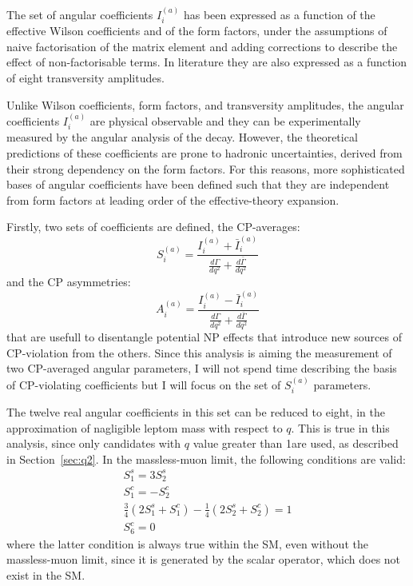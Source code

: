 The set of angular coefficients $I_i^{(a)}$ has been expressed as a function of the effective Wilson coefficients and of the form factors, under the assumptions of naive factorisation of the matrix element and adding corrections to describe the effect of non-factorisable terms.
In literature they are also expressed as a function of eight \Ks transversity amplitudes.

Unlike Wilson coefficients, form factors, and transversity amplitudes, the angular coefficients $I_i^{(a)}$ are physical observable and they can be experimentally measured by the angular analysis of the \BtoKstmumudecay decay.
However, the theoretical predictions of these coefficients are prone to hadronic uncertainties, derived from their strong dependency on the form factors.
For this reasons, more sophisticated bases of angular coefficients have been defined such that they are independent from form factors at leading order of the effective-theory expansion.

Firstly, two sets of coefficients are defined, the CP-averages:
\begin{equation}
  S^{(a)}_i = \frac{ I^{(a)}_i + \bar I^{(a)}_i }{\frac{d\Gamma}{dq^2} + \frac{d\bar\Gamma}{dq^2}}
  \label{eq:Ss}
\end{equation}
and the CP asymmetries:
\begin{equation}
  A^{(a)}_i = \frac{ I^{(a)}_i - \bar I^{(a)}_i }{\frac{d\Gamma}{dq^2}+\frac{d\bar\Gamma}{dq^2}}
  \label{eq:As}
\end{equation}
that are usefull to disentangle potential NP effects that introduce new sources of CP-violation from the others.
Since this analysis is aiming the measurement of two CP-averaged angular parameters, I will not spend time describing the basis of CP-violating coefficients but I will focus on the set of $S^{(a)}_i$ parameters.

The twelve real angular coefficients in this set can be reduced to eight, in the approximation of nagligible leptom mass with respect to $q$.
This is true in this analysis, since only candidates with $q$ value greater than 1\GeV are used, as described in Section~\ref{sec:q2}.
In the massless-muon limit, the following conditions are valid:
\begin{gather}
  S_1^s = 3 S_2^s \nonumber\\
  S_1^c = - S_2^c \nonumber\\
  \frac{3}{4}\left(2S_1^s+S_1^c\right)-\frac{1}{4}\left(2S_2^s+S_2^c\right) = 1 \nonumber\\
  S_6^c = 0 \label{eq:massless-reductions}
\end{gather}
where the latter condition is always true within the SM, even without the massless-muon limit, since it is generated by the scalar operator, which does not exist in the SM.

